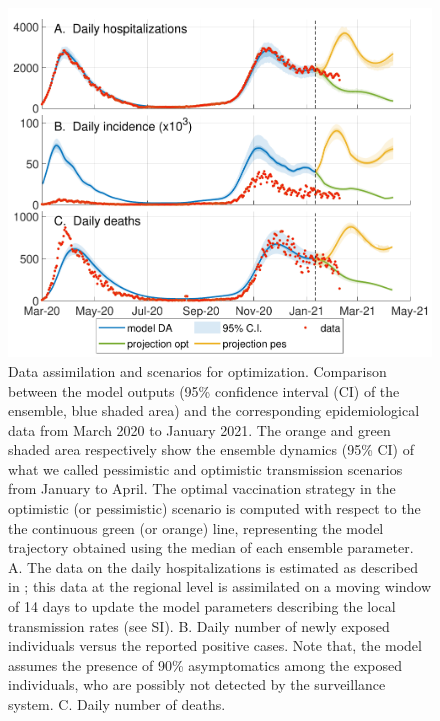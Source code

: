 \begin{figure}[!ht]%
    \centering
    \includegraphics{fig_italy-ocp/figures/DA_italy1.pdf}
    \caption[Data assimilation and scenarios for optimization]{Data assimilation and scenarios for optimization. Comparison between the model outputs (95\% confidence interval (CI) of the ensemble, blue shaded area) and the corresponding epidemiological data from March 2020 to January 2021. The orange and green shaded area respectively show the ensemble dynamics (95\% CI) of what we called pessimistic and optimistic transmission scenarios from January to April. The optimal vaccination strategy in the optimistic (or pessimistic) scenario is computed with respect to the the continuous green (or orange) line, representing the model trajectory obtained using the median of each ensemble parameter. A. The data on the daily hospitalizations is estimated as described in \parencite{Bertuzzo:GeographyCOVID19Spread:2020}; this data at the regional level is assimilated on a moving window of 14 days to update the model parameters describing the local transmission rates (see SI). B. Daily number of newly exposed individuals versus the reported positive cases. Note that, the model assumes the presence of 90\% asymptomatics among the exposed individuals, who are possibly not detected by the surveillance system. C. Daily number of deaths. %
    }\label{fig:model_DA}
\end{figure}

